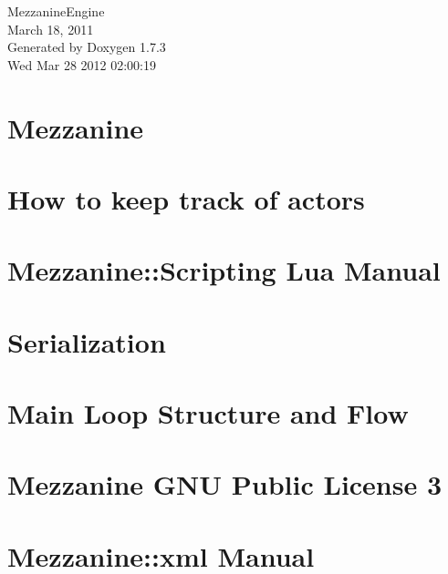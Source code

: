 \documentclass[a4paper]{article}
\begin{document}
\hypersetup{pageanchor=false}
\begin{titlepage}
\vspace*{7cm}
\begin{center}
{\Large MezzanineEngine \\[1ex]\large March 18, 2011 }\\
\vspace*{1cm}
{\large Generated by Doxygen 1.7.3}\\
\vspace*{0.5cm}
{\small Wed Mar 28 2012 02:00:19}\\
\end{center}
\end{titlepage}
\tableofcontents
{}
\hypersetup{pageanchor=true}
\section{Mezzanine}
\label{index}\hypertarget{index}{}
\section{How to keep track of actors}
\label{actorcontainer1}
\hypertarget{actorcontainer1}{}

\section{Mezzanine::Scripting Lua Manual}
\label{LuaManual}
\hypertarget{LuaManual}{}

\section{Serialization}
\label{Serialization}
\hypertarget{Serialization}{}

\section{Main Loop Structure and Flow}
\label{mainloop1}
\hypertarget{mainloop1}{}

\section{Mezzanine GNU Public License 3}
\label{GPLLicense}
\hypertarget{GPLLicense}{}

\section{Mezzanine::xml Manual}
\label{XMLManual}
\hypertarget{XMLManual}{}

\end{document}
